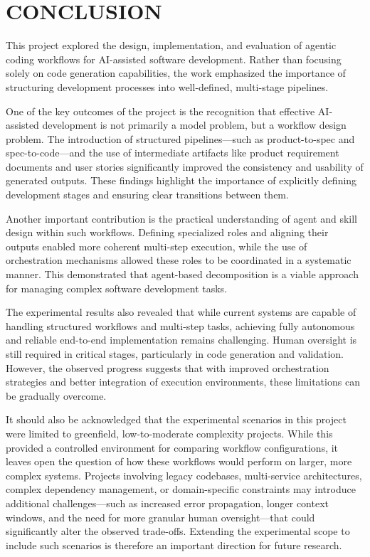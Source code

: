 \documentclass[a4paper,12pt]{report}
\begin{document}
\chapter{CONCLUSION}
This project explored the design, implementation, and evaluation of agentic coding workflows for AI-assisted software development. Rather than focusing solely on code generation capabilities, the work emphasized the importance of structuring development processes into well-defined, multi-stage pipelines.

One of the key outcomes of the project is the recognition that effective AI-assisted development is not primarily a model problem, but a workflow design problem. The introduction of structured pipelines---such as product-to-spec and spec-to-code---and the use of intermediate artifacts like product requirement documents and user stories significantly improved the consistency and usability of generated outputs. These findings highlight the importance of explicitly defining development stages and ensuring clear transitions between them.

Another important contribution is the practical understanding of agent and skill design within such workflows. Defining specialized roles and aligning their outputs enabled more coherent multi-step execution, while the use of orchestration mechanisms allowed these roles to be coordinated in a systematic manner. This demonstrated that agent-based decomposition is a viable approach for managing complex software development tasks.

The experimental results also revealed that while current systems are capable of handling structured workflows and multi-step tasks, achieving fully autonomous and reliable end-to-end implementation remains challenging. Human oversight is still required in critical stages, particularly in code generation and validation. However, the observed progress suggests that with improved orchestration strategies and better integration of execution environments, these limitations can be gradually overcome.

It should also be acknowledged that the experimental scenarios in this project were limited to greenfield, low-to-moderate complexity projects. While this provided a controlled environment for comparing workflow configurations, it leaves open the question of how these workflows would perform on larger, more complex systems. Projects involving legacy codebases, multi-service architectures, complex dependency management, or domain-specific constraints may introduce additional challenges---such as increased error propagation, longer context windows, and the need for more granular human oversight---that could significantly alter the observed trade-offs. Extending the experimental scope to include such scenarios is therefore an important direction for future research.
\end{document}

